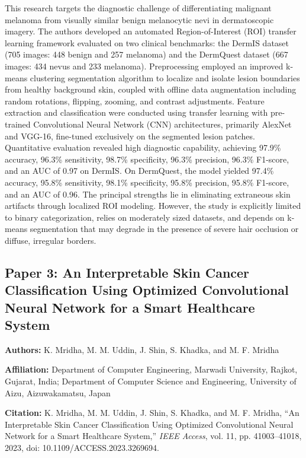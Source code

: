 \documentclass[conference]{IEEEtran}
\begin{document}
This research targets the diagnostic challenge of differentiating malignant melanoma from visually similar benign melanocytic nevi in dermatoscopic imagery. The authors developed an automated Region-of-Interest (ROI) transfer learning framework evaluated on two clinical benchmarks: the DermIS dataset (705 images: 448 benign and 257 melanoma) and the DermQuest dataset (667 images: 434 nevus and 233 melanoma). Preprocessing employed an improved k-means clustering segmentation algorithm to localize and isolate lesion boundaries from healthy background skin, coupled with offline data augmentation including random rotations, flipping, zooming, and contrast adjustments. Feature extraction and classification were conducted using transfer learning with pre-trained Convolutional Neural Network (CNN) architectures, primarily AlexNet and VGG-16, fine-tuned exclusively on the segmented lesion patches. Quantitative evaluation revealed high diagnostic capability, achieving 97.9\% accuracy, 96.3\% sensitivity, 98.7\% specificity, 96.3\% precision, 96.3\% F1-score, and an AUC of 0.97 on DermIS. On DermQuest, the model yielded 97.4\% accuracy, 95.8\% sensitivity, 98.1\% specificity, 95.8\% precision, 95.8\% F1-score, and an AUC of 0.96. The principal strengths lie in eliminating extraneous skin artifacts through localized ROI modeling. However, the study is explicitly limited to binary categorization, relies on moderately sized datasets, and depends on k-means segmentation that may degrade in the presence of severe hair occlusion or diffuse, irregular borders.

\subsection{Paper 3: An Interpretable Skin Cancer Classification Using Optimized Convolutional Neural Network for a Smart Healthcare System}

\textbf{Authors:} K. Mridha, M. M. Uddin, J. Shin, S. Khadka, and M. F. Mridha

\textbf{Affiliation:} Department of Computer Engineering, Marwadi University, Rajkot, Gujarat, India; Department of Computer Science and Engineering, University of Aizu, Aizuwakamatsu, Japan

\textbf{Citation:} K. Mridha, M. M. Uddin, J. Shin, S. Khadka, and M. F. Mridha, ``An Interpretable Skin Cancer Classification Using Optimized Convolutional Neural Network for a Smart Healthcare System,'' \textit{IEEE Access}, vol. 11, pp. 41003--41018, 2023, doi: 10.1109/ACCESS.2023.3269694.
\end{document}
